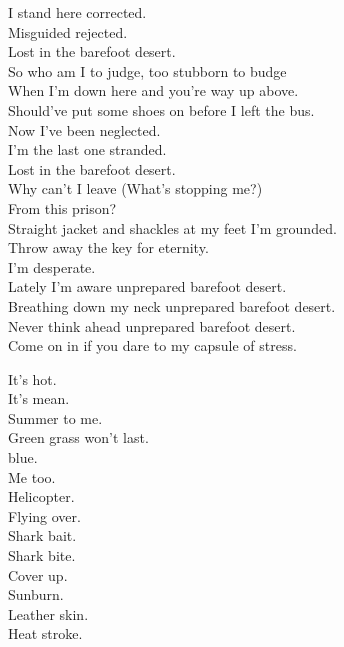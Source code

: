 I stand here corrected. \\
Misguided rejected. \\
Lost in the barefoot desert. \\

So who am I to judge, too stubborn to budge \\
When I'm down here and you're way up above. \\
Should've put some shoes on before I left the bus. \\

Now I've been neglected. \\
I'm the last one stranded. \\
Lost in the barefoot desert. \\
Why can't I leave (What's stopping me?) \\
From this prison? \\
Straight jacket and shackles at my feet I'm grounded. \\
Throw away the key for eternity. \\
I'm desperate. \\

Lately I'm aware unprepared barefoot desert. \\
Breathing down my neck unprepared barefoot desert. \\
Never think ahead unprepared barefoot desert. \\
Come on in if you dare to my capsule of stress. \\




It's hot. \\
It's mean. \\
Summer to me. \\
Green grass won't last. \\
 blue. \\
Me too. \\
Helicopter. \\
Flying over. \\
Shark bait. \\
Shark bite. \\
Cover up. \\
Sunburn. \\
Leather skin. \\
Heat stroke. \\

